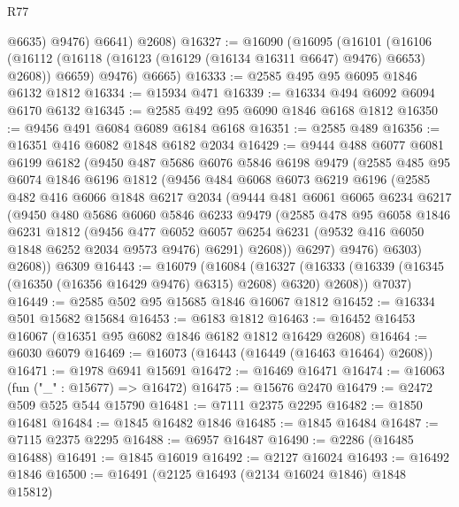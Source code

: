 \begin{lexlean}{R77}
\begin{coremodule}
            @6635)
          @9476)
        @6641)
      @2608)
@16327 := @16090
    (@16095
      (@16101
        (@16106 (@16112 (@16118 (@16123 (@16129 (@16134 @16311 @6647) @9476) @6653) @2608)) @6659)
        @9476)
      @6665)
@16333 := @2585 @495 @95 @6095 @1846 @6132 @1812
@16334 := @15934 @471
@16339 := @16334 @494 @6092 @6094 @6170 @6132
@16345 := @2585 @492 @95 @6090 @1846 @6168 @1812
@16350 := @9456 @491 @6084 @6089 @6184 @6168
@16351 := @2585 @489
@16356 := @16351 @416 @6082 @1848 @6182 @2034
@16429 := @9444
    @488
    @6077
    @6081
    @6199
    @6182
    (@9450
      @487
      @5686
      @6076
      @5846
      @6198
      @9479
      (@2585
        @485
        @95
        @6074
        @1846
        @6196
        @1812
        (@9456
          @484
          @6068
          @6073
          @6219
          @6196
          (@2585
            @482
            @416
            @6066
            @1848
            @6217
            @2034
            (@9444
              @481
              @6061
              @6065
              @6234
              @6217
              (@9450
                @480
                @5686
                @6060
                @5846
                @6233
                @9479
                (@2585
                  @478
                  @95
                  @6058
                  @1846
                  @6231
                  @1812
                  (@9456
                    @477
                    @6052
                    @6057
                    @6254
                    @6231
                    (@9532 @416 @6050 @1848 @6252 @2034 @9573 @9476)
                    @6291)
                  @2608))
              @6297)
            @9476)
          @6303)
        @2608))
    @6309
@16443 := @16079
    (@16084
      (@16327 (@16333 (@16339 (@16345 (@16350 (@16356 @16429 @9476) @6315) @2608) @6320) @2608))
      @7037)
@16449 := @2585 @502 @95 @15685 @1846 @16067 @1812
@16452 := @16334 @501 @15682 @15684
@16453 := @6183 @1812
@16463 := @16452 @16453 @16067 (@16351 @95 @6082 @1846 @6182 @1812 @16429 @2608)
@16464 := @6030 @6079
@16469 := @16073 (@16443 (@16449 (@16463 @16464) @2608))
@16471 := @1978 @6941 @15691
@16472 := @16469 @16471
@16474 := @16063 (fun ("_" : @15677) => @16472)
@16475 := @15676 @2470
@16479 := @2472 @509 @525 @544 @15790
@16481 := @7111 @2375 @2295
@16482 := @1850 @16481
@16484 := @1845 @16482 @1846
@16485 := @1845 @16484
@16487 := @7115 @2375 @2295
@16488 := @6957 @16487
@16490 := @2286 (@16485 @16488)
@16491 := @1845 @16019
@16492 := @2127 @16024
@16493 := @16492 @1846
@16500 := @16491 (@2125 @16493 (@2134 @16024 @1846) @1848 @15812)

\end{coremodule}
\end{lexlean}
